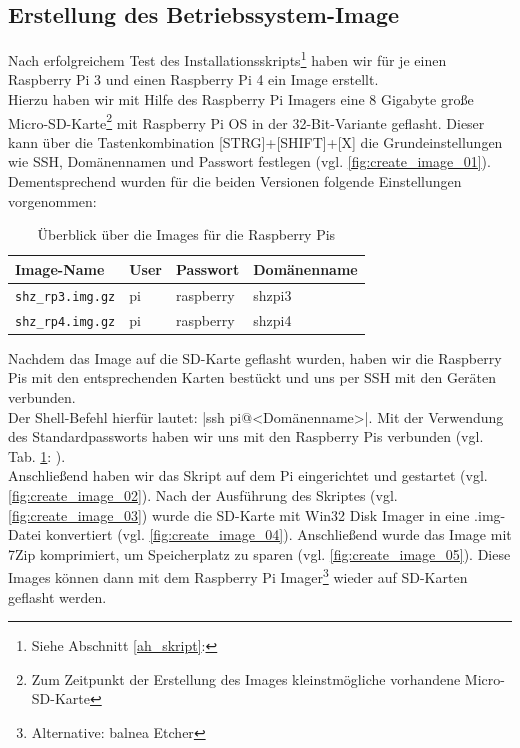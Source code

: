 \subsection{Erstellung des Betriebssystem-Image}\label{sw_image}
Nach erfolgreichem Test des Installationsskripts\footnote{Siehe Abschnitt \ref{ah_skript}: } haben wir für je einen Raspberry Pi 3 und einen Raspberry Pi 4 ein Image erstellt.\\
\noindent Hierzu haben wir mit Hilfe des Raspberry Pi Imagers eine 8 Gigabyte große Micro-SD-Karte\footnote{Zum Zeitpunkt der Erstellung des Images kleinstmögliche vorhandene Micro-SD-Karte} mit Raspberry Pi OS in der 32-Bit-Variante geflasht. 
Dieser kann über die Tastenkombination [STRG]+[SHIFT]+[X] die Grundeinstellungen wie SSH, Domänennamen und Passwort festlegen (vgl. \ref{fig:create_image_01}).
Dementsprechend wurden für die beiden Versionen folgende Einstellungen vorgenommen:\\
\begin{table}[H]
    \begin{tabularx}{\textwidth}{|p{3cm}|p{3cm}|p{4cm}|p{3.7cm}|}
        \hline
        \textbf{Image-Name} & \textbf{User} & \textbf{Passwort} & \textbf{Domänenname} \\
        \hline
        \hline
        \texttt{shz\_rp3.img.gz} & pi & raspberry & shzpi3\\
        \hline
        \texttt{shz\_rp4.img.gz} & pi & raspberry & shzpi4\\
        \hline
    \end{tabularx}
    \caption{Überblick über die Images für die Raspberry Pis}
    \label{tab:image_uebersicht}
\end{table}
\noindent Nachdem das Image auf die SD-Karte geflasht wurden, haben wir die Raspberry Pis mit den entsprechenden Karten bestückt und uns per SSH mit den Geräten verbunden.\\
\noindent Der Shell-Befehl hierfür lautet:
|ssh pi@<Domänenname>|.
\noindent Mit der Verwendung des Standardpassworts haben wir uns mit den Raspberry Pis verbunden (vgl. Tab. \ref{tab:image_uebersicht}: ).\\
\noindent Anschließend haben wir das Skript auf dem Pi eingerichtet und gestartet (vgl. \ref{fig:create_image_02}).
Nach der Ausführung des Skriptes (vgl. \ref{fig:create_image_03}) wurde die SD-Karte mit Win32 Disk Imager in eine .img-Datei konvertiert (vgl. \ref{fig:create_image_04}).
Anschließend wurde das Image mit 7Zip komprimiert, um Speicherplatz zu sparen (vgl. \ref{fig:create_image_05}). Diese Images können dann mit dem Raspberry Pi Imager\footnote{Alternative: balnea Etcher} wieder auf SD-Karten geflasht werden.\\
